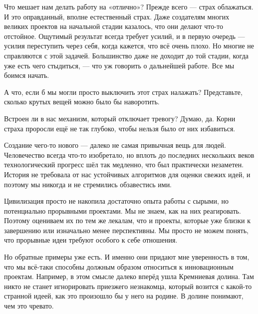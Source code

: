 \documentclass[ebook,12pt,oneside,openany]{memoir}
\begin{document}
\maketitle

Что мешает нам делать работу на «отлично»? Прежде всего — страх
облажаться. И это оправданный, вполне естественный страх. Даже
создателям многих великих проектов на начальной стадии казалось, что
они делают что-то отстойное. Ощутимый результат всегда требует усилий,
и в первую очередь — усилия переступить через себя, когда кажется, что
всё очень плохо. Но многие не справляются с этой задачей. Большинство
даже не доходит до той стадии, когда уже есть чего стыдиться, — что уж
говорить о дальнейшей работе. Все мы боимся начать. \newline

А что, если б мы могли просто выключить этот страх налажать?
Представьте, сколько крутых вещей можно было бы наворотить. \newline

Встроен ли в нас механизм, который отключает тревогу? Думаю, да. Корни
страха проросли ещё не так глубоко, чтобы нельзя было от них
избавиться. \newline

Создание чего-то нового — далеко не самая привычная вещь для людей.
Человечество всегда что-то изобретало, но вплоть до последних
нескольких веков технологический прогресс шёл так медленно, что был
практически незаметен. История не требовала от нас устойчивых
алгоритмов для оценки свежих идей, и поэтому мы никогда и не
стремились обзавестись ими. \newline

Цивилизация просто не накопила достаточно опыта работы с сырыми, но
потенциально прорывными проектами. Мы не знаем, как на них
реагировать. Поэтому оцениваем их по тем же лекалам, что и проекты,
которые уже близки к завершению или изначально менее перспективны. Мы
просто не можем понять, что прорывные идеи требуют особого к себе
отношения. \newline

Но обратные примеры уже есть. И именно они придают мне уверенность в
том, что мы всё-таки способны должным образом относиться к
инновационным проектам. Например, в этом смысле далеко вперёд ушла
Кремниевая долина. Там никто не станет игнорировать приезжего
незнакомца, который возится с какой-то странной идеей, как это
произошло бы у него на родине. В долине понимают, чем это чревато. \newline
\end{document}
